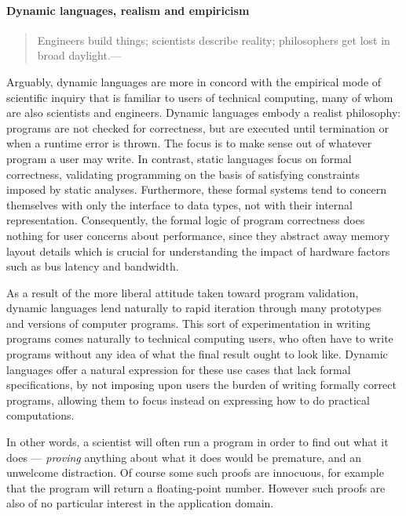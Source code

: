 \paragraph{Dynamic languages, realism and empiricism}

\begin{quote}
Engineers build things; scientists describe reality; philosophers get lost in broad daylight.---\cite{Gabriel2012}
\end{quote}

Arguably, dynamic languages are more in concord with the empirical mode of scientific inquiry that is familiar to users of technical computing, many of whom are also scientists and engineers. Dynamic languages embody a realist philosophy: programs are not checked for correctness, but are executed until termination or when a runtime error is thrown. The focus is to make sense out of whatever program a user may write. In contrast, static languages focus on formal correctness, validating programming on the basis of satisfying constraints imposed by static analyses. Furthermore, these formal systems tend to concern themselves with only the interface to data types, not with their internal representation. Consequently, the formal logic of program correctness does nothing for user concerns about performance, since they abstract away memory layout details which is crucial for understanding the impact of hardware factors such as bus latency and bandwidth.

As a result of the more liberal attitude taken toward program validation, dynamic languages lend naturally to rapid iteration through many prototypes and versions of computer programs. This sort of experimentation in writing programs comes naturally to technical computing users, who often have to write programs without any idea of what the final result ought to look like. Dynamic languages offer a natural expression for these use cases that lack formal specifications, by not imposing upon users the burden of writing formally correct programs, allowing them to focus instead on expressing how to do practical computations.

In other words, a scientist will often run a program in order to find out what it does ---
\emph{proving} anything about what it does would be premature, and an unwelcome distraction.
Of course some such proofs are innocuous, for example that the program will return a
floating-point number. However such proofs are also of no particular interest in the
application domain.

